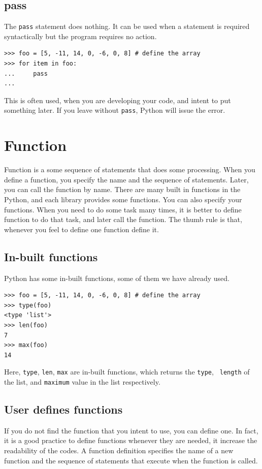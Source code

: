 \documentclass[10pt]{book}
\begin{document}
{\subsection{pass}
The \verb"pass" statement does nothing. It can be used when a statement is required syntactically but the program requires no action. 
\beforeverb
\begin{verbatim}
>>> foo = [5, -11, 14, 0, -6, 0, 8] # define the array
>>> for item in foo:
...     pass
... 
\end{verbatim}
\afterverb
This is often used, when you are developing your code, and intent to put something later. If you leave without \verb"pass", Python will issue the error.

\section{Function}
Function is a some sequence of statements that does some processing. When you define a function, you specify the name and the sequence of statements.  Later, you can call the function by name. There are many built in functions in the Python, and each library provides some functions. You can also specify your functions. When you need to do some task many times, it is better to define function to do that task, and later call the function. The thumb rule is that, whenever you feel to define one function define it.

\subsection{In-built functions}
Python has some in-built functions, some of them we have already used. 
\beforeverb
\begin{verbatim}
>>> foo = [5, -11, 14, 0, -6, 0, 8] # define the array
>>> type(foo)
<type 'list'>
>>> len(foo)
7
>>> max(foo)
14
\end{verbatim}
\afterverb
Here, \verb"type", \verb"len", \verb"max" are in-built functions, which returns the \verb"type", \verb" length" of the list, and \verb"maximum" value in the list respectively. 

\subsection{User defines functions}
If you do not find the function that you intent to use, you can define one. In fact, it is a good practice to define functions whenever they are needed, it increase the readability of the codes. A function definition specifies the name of a new function and the sequence of statements that execute when the function is called.

}
\end{document}
